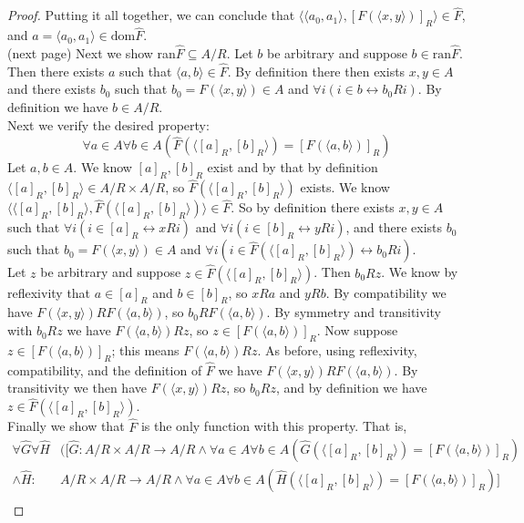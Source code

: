 \documentclass{report}
\begin{document}
\begin{proof}
Putting it all together, we can conclude that $\langle\langle a_0,a_1\rangle,[F(\langle x,y\rangle)]_R\rangle\in\hat F$, and $a=\langle a_0,a_1\rangle\in\text{dom}\hat F$.\\
(next page)\newpage
Next we show ran$\hat F\subseteq A/R$. Let $b$ be arbitrary and suppose $b\in\text{ran}\hat F$. Then there exists $a$ such that $\langle a,b\rangle\in\hat F$. 
By definition there then exists $x,y\in A$ and there exists $b_0$ such that $b_0=F(\langle x,y\rangle)\in A$ and $\forall i(i\in b\leftrightarrow b_0Ri)$. By definition we have $b\in A/R$.\\
\indent Next we verify the desired property:
\begin{equation*}
\forall a\in A\forall b\in A(\hat F(\langle[a]_R,[b]_R\rangle)=[F(\langle a,b\rangle)]_R)
\end{equation*}
Let $a,b\in A$. We know $[a]_R,[b]_R$ exist and by that by definition $\langle[a]_R,[b]_R\rangle\in A/R\times A/R$, so $\hat F(\langle[a]_R,[b]_R\rangle)$ exists. 
We know $\langle\langle[a]_R,[b]_R\rangle,\hat F(\langle[a]_R,[b]_R\rangle)\rangle\in\hat F$.
So by definition there exists $x,y\in A$ such that $\forall i(i\in[a]_R\leftrightarrow xRi)$ and $\forall i(i\in[b]_R\leftrightarrow yRi)$, and there exists $b_0$ such that 
$b_0=F(\langle x,y\rangle)\in A$ and $\forall i(i\in\hat F(\langle[a]_R,[b]_R\rangle)\leftrightarrow b_0Ri)$.\\
\indent Let $z$ be arbitrary and suppose $z\in\hat F(\langle[a]_R,[b]_R\rangle)$. Then $b_0Rz$.
We know by reflexivity that $a\in[a]_R$ and $b\in[b]_R$, so $xRa$ and $yRb$.
By compatibility we have $F(\langle x,y\rangle)RF(\langle a,b\rangle)$, so $b_0RF(\langle a,b\rangle)$. By symmetry and transitivity with $b_0Rz$ we have 
$F(\langle a,b\rangle)Rz$, so $z\in[F(\langle a,b\rangle)]_R$. Now suppose $z\in[F(\langle a,b\rangle)]_R$; this means $F(\langle a,b\rangle)Rz$. 
As before, using reflexivity, compatibility, and the definition of
$\hat F$ we have $F(\langle x,y\rangle)RF(\langle a,b\rangle)$. By transitivity we then have
$F(\langle x,y\rangle)Rz$, so $b_0Rz$, and by definition we have $z\in\hat F(\langle[a]_R,[b]_R\rangle)$.\\
\indent Finally we show that $\hat F$ is the only function with this property. That is,
\begin{align*}
\forall\hat G\forall\hat H&([\hat G:A/R\times A/R\to A/R\land\forall a\in A\forall b\in A(\hat G(\langle[a]_R,[b]_R\rangle)=[F(\langle a,b\rangle)]_R)\\
\land\hat H:&A/R\times A/R\to A/R\land\forall a\in A\forall b\in A(\hat H(\langle[a]_R,[b]_R\rangle)=[F(\langle a,b\rangle)]_R)]\\

\end{align*}
\end{proof}
\end{document}
